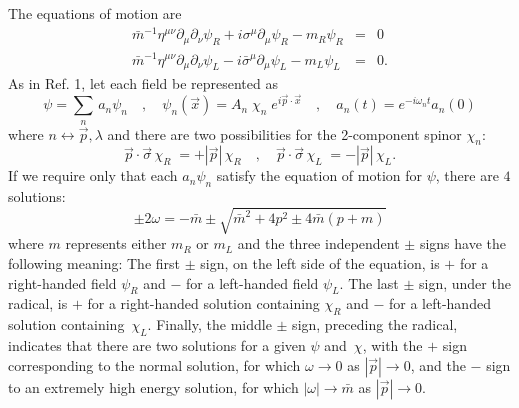 \documentclass{ws-procs9x6}
\begin{document}
The equations of motion are
\begin{eqnarray}
\bar{m}^{-1}\eta ^{\mu \nu }\partial _{\mu }\partial _{\nu }\psi
_{R}+i\sigma ^{\mu }\partial _{\mu }\psi _{R}-m_{R}\psi _{R} &=&0 \\
\bar{m}^{-1}\eta ^{\mu \nu }\partial _{\mu }\partial _{\nu }\psi _{L}-i
\bar{\sigma}^{\mu }\partial _{\mu }\psi _{L}-m_{L}\psi _{L} &=&0.
\end{eqnarray}
As in Ref. 1, let each field be represented as
\begin{equation}
\psi =\sum_{n}\,a_{n}\psi _{n} \quad , \quad
\psi _{n}\left( \vec{x}\right) =A_{n}\;\chi _{n}\;e^{i\vec{p}\cdot \vec{x}}
\quad , \quad  a_{n}\left( t\right) =e^{-i\omega _{n}t}a_{n}\left( 0\right)
\end{equation}
where $n\leftrightarrow \vec{p},\lambda $ and there are two possibilities
for the 2-component spinor $\chi _{n}$:
\begin{equation}
\vec{p}\cdot \vec{\sigma}\,\chi _{R}\;=+\left| \vec{p}\right| \,\chi
_{R}\quad ,\quad \vec{p}\cdot \vec{\sigma}\,\chi _{L}\;=-\left| \vec{p}
\right| \,\chi _{L}.
\end{equation}
If we require only that each $a_{n}\psi _{n}$ satisfy the equation of motion
for $\psi $, there are $4$ solutions:
\begin{equation}
\pm 2\omega =-\bar{m}\pm \sqrt{\bar{m}^{2}+4p^{2}\pm 4\bar{m}
\left( p+m\right) }
\end{equation}
where $m$ represents either $m_{R}$ or $m_{L}$ and the three independent
$\pm $ signs have the following meaning: The first $\pm $ sign, on the left
side of the equation, is $+$ for a right-handed field $\psi _{R}$ and $-$
for a left-handed field $\psi _{L}$. The last $\pm $ sign, under the
radical, is $+$ for a right-handed solution containing $\chi _{R}$ and
$- $ for a left-handed solution containing $\,\chi _{L}$. Finally, the
middle $\pm $ sign, preceding the radical, indicates that there are two
solutions for a given $\psi $ and $\,\chi $, with the $+$ sign corresponding
to the normal solution, for which $\omega \rightarrow 0$ as $\left| \vec{p}
\right| \rightarrow 0$, and the $-$ sign to an extremely high energy
solution, for which $\left| \omega \right| \rightarrow \bar{m}$ as
$\left| \vec{p}\right| \rightarrow 0$.
\end{document}
